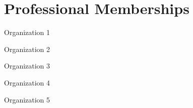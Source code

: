 \documentclass[11pt]{article}
\begin{document}

\section*{Professional Memberships}

\hspace{-.25em}\begin{itemize*}[itemjoin={{ $\bullet$}}, label={}]
\item Organization 1
\item Organization 2
\item Organization 3
\item Organization 4
\item Organization 5
\end{itemize*}

\end{document}
